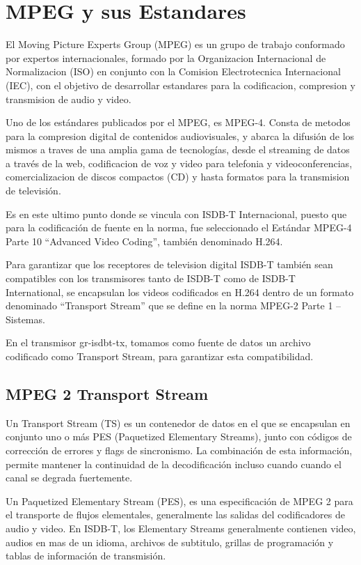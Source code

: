 \section{MPEG y sus Estandares}

El Moving Picture Experts Group (MPEG)\cite{MPEG} es un grupo de trabajo conformado por expertos internacionales, formado por la Organizacion Internacional de Normalizacion (ISO) en conjunto con la Comision Electrotecnica Internacional (IEC), con el objetivo de desarrollar estandares para la codificacion, compresion y transmision de audio y video.

Uno de los estándares publicados por el MPEG, es MPEG-4. Consta de metodos para la compresion digital de contenidos audiovisuales,  y abarca la difusión de los mismos a traves de una amplia gama de tecnologías, desde el streaming de datos a través de la web, codificacion de voz y video para telefonia y videoconferencias, comercializacion de discos compactos (CD) y hasta formatos para la transmision de televisión. 

Es en este ultimo punto donde se vincula con ISDB-T Internacional, puesto que para la codificación de fuente en la norma, fue seleccionado el Estándar MPEG-4 Parte 10 “Advanced Video Coding”, también denominado H.264.

Para garantizar que los receptores de television digital ISDB-T también sean compatibles con los transmisores tanto de ISDB-T como de ISDB-T International, se encapsulan los videos codificados en H.264 dentro de un formato denominado “Transport Stream” que se define en la norma MPEG-2 Parte 1 – Sistemas.

En el transmisor gr-isdbt-tx, tomamos como fuente de datos un archivo codificado como Transport Stream, para garantizar esta compatibilidad.

	\subsection{MPEG 2 Transport Stream}
	
	Un Transport Stream (TS) es un contenedor de datos en el que se encapsulan en conjunto uno o más PES (Paquetized Elementary Streams), junto con códigos de corrección de errores y flags de sincronismo. La combinación de esta información, permite mantener la continuidad de la decodificación incluso cuando cuando el canal se degrada fuertemente.
	
	Un Paquetized Elementary Stream (PES), es una especificación de MPEG 2 para el transporte de flujos elementales, generalmente las salidas del codificadores de audio y video. En ISDB-T, los Elementary Streams generalmente contienen video, audios en mas de un idioma, archivos de subtitulo, grillas de programación y tablas de información de transmisión.
	
